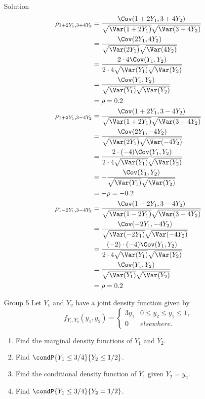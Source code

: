 \documentclass{article}
\theoremstyle{plain}
\theoremstyle{definition}
\theoremstyle{remark}
\begin{document}
\begin{solution}
    {Solution}
    \begin{align*}
        \rho_{1+2Y_1,3+4Y_2} &= \frac{\Cov(1+2Y_1,3+4Y_2)}{\sqrt{\Var(1+2Y_1)}\sqrt{\Var(3+4Y_2)}} \\
        &= \frac{\Cov(2Y_1,4Y_2)}{\sqrt{\Var(2Y_1)}\sqrt{\Var(4Y_2)}} \\
        &= \frac{2\cdot 4\Cov(Y_1,Y_2)}{2\cdot 4\sqrt{\Var(Y_1)}\sqrt{\Var(Y_2)}} \\
        &= \frac{\Cov(Y_1,Y_2)}{\sqrt{\Var(Y_1)}\sqrt{\Var(Y_2)}} \\
        &= \rho = 0.2 \\
        \rho_{1+2Y_1,3-4Y_2} &= \frac{\Cov(1+2Y_1,3-4Y_2)}{\sqrt{\Var(1+2Y_1)}\sqrt{\Var(3-4Y_2)}} \\
        &= \frac{\Cov(2Y_1,-4Y_2)}{\sqrt{\Var(2Y_1)}\sqrt{\Var(-4Y_2)}} \\
        &= \frac{2\cdot (-4)\Cov(Y_1,Y_2)}{2\cdot 4\sqrt{\Var(Y_1)}\sqrt{\Var(Y_2)}} \\
        &= -\frac{\Cov(Y_1,Y_2)}{\sqrt{\Var(Y_1)}\sqrt{\Var(Y_2)}} \\
        &= -\rho = -0.2 \\
        \rho_{1-2Y_1,3-4Y_2} &= \frac{\Cov(1-2Y_1,3-4Y_2)}{\sqrt{\Var(1-2Y_1)}\sqrt{\Var(3-4Y_2)}} \\
        &= \frac{\Cov(-2Y_1,-4Y_2)}{\sqrt{\Var(-2Y_1)}\sqrt{\Var(-4Y_2)}} \\
        &= \frac{(-2)\cdot (-4)\Cov(Y_1,Y_2)}{2\cdot 4\sqrt{\Var(Y_1)}\sqrt{\Var(Y_2)}} \\
        &= \frac{\Cov(Y_1,Y_2)}{\sqrt{\Var(Y_1)}\sqrt{\Var(Y_2)}} \\
        &= \rho = 0.2
    \end{align*}
\end{solution}

\begin{problem}
    {Group 5}
    Let $Y_1$ and $Y_2$ have a joint density function given by
    \[
        f_{Y_1,Y_2} (y_1, y_2) = {
            \begin{cases}
                3y_1 & 0 \leq y_2 \leq y_1 \leq 1,\\
                0 & elsewhere.
            \end{cases}
        }
    \]
    \begin{enumerate}
        \item Find the marginal density functions of $Y_1$ and $Y_2$.
        \item Find $\condP{Y_1 \leq 3/4}{Y_2 \leq 1/2}$.
        \item Find the conditional density function of $Y_1$ given $Y_2 = y_2$.
        \item Find $\condP{Y_1 \leq 3/4}{Y_2 = 1/2}$.
    \end{enumerate}
\end{problem}
\end{document}

